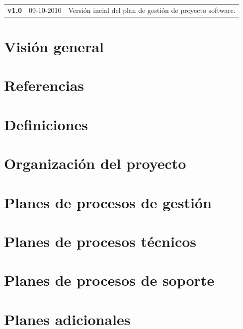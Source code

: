 \documentclass[a4paper,11pt,oneside]{report}
\begin{document}
\begin{center}
\begin{tabularx}{\textwidth}{p{}p{}X}
\textbf{v1.0} & 09-10-2010 & Versión incial del plan de gestión de proyecto
software.
\end{tabularx}
\end{center}

\clearpage

\tableofcontents
{}

\clearpage

\pagestyle{fancy}

\chapter{Visión general}


\chapter{Referencias}


\chapter{Definiciones}


\chapter{Organización del proyecto}


\chapter{Planes de procesos de gestión}


\chapter{Planes de procesos técnicos}


\chapter{Planes de procesos de soporte}


\chapter{Planes adicionales}

\end{document}
